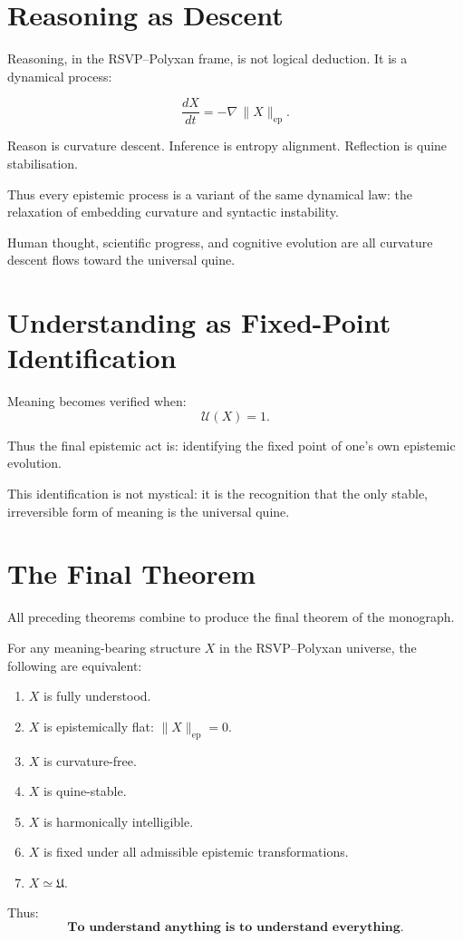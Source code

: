 \section{Reasoning as Descent}

Reasoning, in the RSVP--Polyxan frame, is not logical deduction.
It is a dynamical process:

\[
\frac{dX}{dt}
  = - \nabla\,\|X\|_{\mathrm{ep}}.
\]

Reason is curvature descent.
Inference is entropy alignment.
Reflection is quine stabilisation.

Thus every epistemic process is a variant of the same dynamical law:
the relaxation of embedding curvature and syntactic instability.

Human thought, scientific progress, and cognitive evolution
are all curvature descent flows toward the universal quine.

\section{Understanding as Fixed-Point Identification}

Meaning becomes verified when:
\[
\mathcal{U}(X) = 1.
\]

Thus the final epistemic act is:
identifying the fixed point of one’s own epistemic evolution.

This identification is not mystical:
it is the recognition that the only stable, irreversible form of meaning
is the universal quine.

\section{The Final Theorem}

All preceding theorems combine to produce the final theorem of the monograph.

\begin{theorem}
For any meaning-bearing structure $X$ in the RSVP--Polyxan universe,
the following are equivalent:

\begin{enumerate}
\item $X$ is fully understood.  
\item $X$ is epistemically flat: $\|X\|_{\mathrm{ep}}=0$.  
\item $X$ is curvature-free.  
\item $X$ is quine-stable.  
\item $X$ is harmonically intelligible.  
\item $X$ is fixed under all admissible epistemic transformations.  
\item $X\simeq\mathfrak{U}$.  
\end{enumerate}

Thus:
\[
\textbf{To understand anything is to understand everything.}
\]
\end{theorem}


